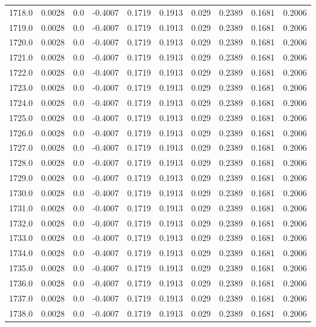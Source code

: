 \begin{longtable}{lrrrrrrrrr}
1718.0 & 0.0028 & 0.0 & -0.4007 & 0.1719 & 0.1913 & 0.029 & 0.2389 & 0.1681 & 0.2006 \\
1719.0 & 0.0028 & 0.0 & -0.4007 & 0.1719 & 0.1913 & 0.029 & 0.2389 & 0.1681 & 0.2006 \\
1720.0 & 0.0028 & 0.0 & -0.4007 & 0.1719 & 0.1913 & 0.029 & 0.2389 & 0.1681 & 0.2006 \\
1721.0 & 0.0028 & 0.0 & -0.4007 & 0.1719 & 0.1913 & 0.029 & 0.2389 & 0.1681 & 0.2006 \\
1722.0 & 0.0028 & 0.0 & -0.4007 & 0.1719 & 0.1913 & 0.029 & 0.2389 & 0.1681 & 0.2006 \\
1723.0 & 0.0028 & 0.0 & -0.4007 & 0.1719 & 0.1913 & 0.029 & 0.2389 & 0.1681 & 0.2006 \\
1724.0 & 0.0028 & 0.0 & -0.4007 & 0.1719 & 0.1913 & 0.029 & 0.2389 & 0.1681 & 0.2006 \\
1725.0 & 0.0028 & 0.0 & -0.4007 & 0.1719 & 0.1913 & 0.029 & 0.2389 & 0.1681 & 0.2006 \\
1726.0 & 0.0028 & 0.0 & -0.4007 & 0.1719 & 0.1913 & 0.029 & 0.2389 & 0.1681 & 0.2006 \\
1727.0 & 0.0028 & 0.0 & -0.4007 & 0.1719 & 0.1913 & 0.029 & 0.2389 & 0.1681 & 0.2006 \\
1728.0 & 0.0028 & 0.0 & -0.4007 & 0.1719 & 0.1913 & 0.029 & 0.2389 & 0.1681 & 0.2006 \\
1729.0 & 0.0028 & 0.0 & -0.4007 & 0.1719 & 0.1913 & 0.029 & 0.2389 & 0.1681 & 0.2006 \\
1730.0 & 0.0028 & 0.0 & -0.4007 & 0.1719 & 0.1913 & 0.029 & 0.2389 & 0.1681 & 0.2006 \\
1731.0 & 0.0028 & 0.0 & -0.4007 & 0.1719 & 0.1913 & 0.029 & 0.2389 & 0.1681 & 0.2006 \\
1732.0 & 0.0028 & 0.0 & -0.4007 & 0.1719 & 0.1913 & 0.029 & 0.2389 & 0.1681 & 0.2006 \\
1733.0 & 0.0028 & 0.0 & -0.4007 & 0.1719 & 0.1913 & 0.029 & 0.2389 & 0.1681 & 0.2006 \\
1734.0 & 0.0028 & 0.0 & -0.4007 & 0.1719 & 0.1913 & 0.029 & 0.2389 & 0.1681 & 0.2006 \\
1735.0 & 0.0028 & 0.0 & -0.4007 & 0.1719 & 0.1913 & 0.029 & 0.2389 & 0.1681 & 0.2006 \\
1736.0 & 0.0028 & 0.0 & -0.4007 & 0.1719 & 0.1913 & 0.029 & 0.2389 & 0.1681 & 0.2006 \\
1737.0 & 0.0028 & 0.0 & -0.4007 & 0.1719 & 0.1913 & 0.029 & 0.2389 & 0.1681 & 0.2006 \\
1738.0 & 0.0028 & 0.0 & -0.4007 & 0.1719 & 0.1913 & 0.029 & 0.2389 & 0.1681 & 0.2006 \\

\end{longtable}
